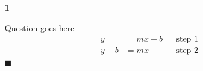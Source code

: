 \documentclass{article}
\newcommand{\qed}{\hfill$\blacksquare$}
\newenvironment{problem}[1]{
    \begin{enumerate}
        \item[\bfseries{#1}]
}
{
    \end{enumerate}
}
\begin{document}
\pagestyle{useheader}

\begin{problem}{1}
    Question goes here
    \begin{align*}
        y &= mx + b && \text{step 1}\\
        y - b &= mx && \text{step 2}\\
	\end{align*}
	\qed
\end{problem}
\end{document}
